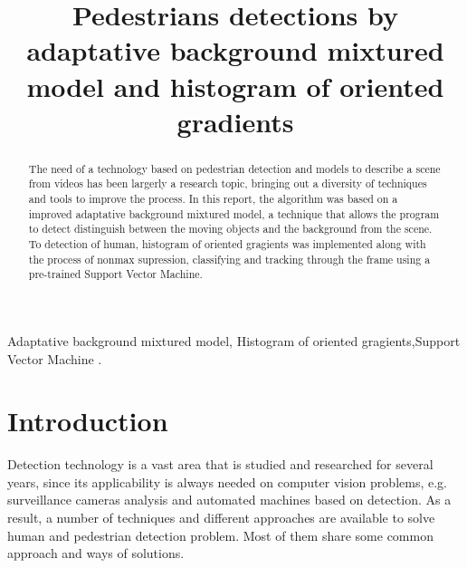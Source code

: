 \documentclass[conference]{IEEEtran}
\begin{document}
\title{Pedestrians detections by adaptative background mixtured model and histogram of oriented gradients\\
}

\author{
\and
{}
}

\maketitle

\begin{abstract}
The need of a technology based on pedestrian detection and models to describe a scene from videos has been largerly a research topic, bringing out a diversity of techniques and tools to improve the process. In this report, the algorithm was based on a improved adaptative  background mixtured model, a technique that allows the program to detect distinguish between the moving objects and the background from the scene. To detection of human, histogram of oriented gragients was implemented along with the process of nonmax supression, classifying and tracking through the frame using a  pre-trained Support Vector Machine.
\end{abstract}

\begin{IEEEkeywords}
Adaptative  background mixtured model, Histogram of oriented gragients,Support Vector Machine .
\end{IEEEkeywords}

\section{Introduction}

	Detection technology is a vast area that is studied and researched for several years, since its applicability is always needed on computer vision problems, e.g. surveillance cameras analysis and automated machines based on detection. As a result, a number of techniques and different approaches are available to solve human and pedestrian detection problem. Most of them share some common approach and ways of solutions. 
	
\end{document}
